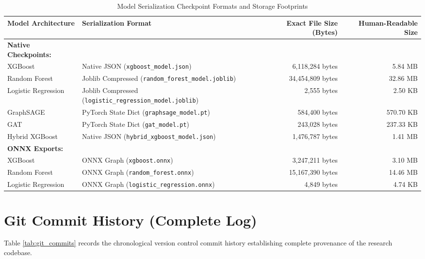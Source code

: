 \documentclass[11pt,a4paper]{report}
\begin{document}
\begin{table}[H]
\centering
\caption{Model Serialization Checkpoint Formats and Storage Footprints}
\label{tab:model_file_sizes}
\begin{tabular}{llrr}
\toprule
\textbf{Model Architecture} & \textbf{Serialization Format} & \textbf{Exact File Size (Bytes)} & \textbf{Human-Readable Size} \\
\midrule
\textbf{Native Checkpoints:} & & & \\
XGBoost & Native JSON (\texttt{xgboost\_model.json}) & 6,118,284 bytes & 5.84 MB \\
Random Forest & Joblib Compressed (\texttt{random\_forest\_model.joblib}) & 34,454,809 bytes & 32.86 MB \\
Logistic Regression & Joblib Compressed (\texttt{logistic\_regression\_model.joblib}) & 2,555 bytes & 2.50 KB \\
GraphSAGE & PyTorch State Dict (\texttt{graphsage\_model.pt}) & 584,400 bytes & 570.70 KB \\
GAT & PyTorch State Dict (\texttt{gat\_model.pt}) & 243,028 bytes & 237.33 KB \\
Hybrid XGBoost & Native JSON (\texttt{hybrid\_xgboost\_model.json}) & 1,476,787 bytes & 1.41 MB \\
\midrule
\textbf{ONNX Exports:} & & & \\
XGBoost & ONNX Graph (\texttt{xgboost.onnx}) & 3,247,211 bytes & 3.10 MB \\
Random Forest & ONNX Graph (\texttt{random\_forest.onnx}) & 15,167,390 bytes & 14.46 MB \\
Logistic Regression & ONNX Graph (\texttt{logistic\_regression.onnx}) & 4,849 bytes & 4.74 KB \\
\bottomrule
\end{tabular}
\end{table}

\section{Git Commit History (Complete Log)}
Table \ref{tab:git_commits} records the chronological version control commit history establishing complete provenance of the research codebase.
\end{document}
